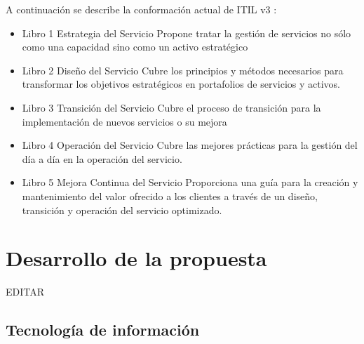 \documentclass[preprint,12pt]{elsarticle}
\begin{document}
A continuación se describe la conformación actual de ITIL v3 :
\begin{itemize}
\item Libro 1  Estrategia del Servicio 
Propone tratar la gestión de servicios no sólo como una capacidad sino como un activo estratégico
\item Libro 2 Diseño del Servicio
Cubre los principios y métodos necesarios para transformar los objetivos estratégicos en portafolios de servicios y activos.
\item Libro 3 Transición del Servicio
Cubre el proceso de transición para la implementación de nuevos servicios o su mejora
\item Libro 4 Operación del Servicio
Cubre las mejores prácticas para la gestión del día a día en la operación del servicio.
\item Libro 5 Mejora Continua del Servicio
Proporciona una guía para la creación y mantenimiento del valor ofrecido a los clientes a través de un diseño, transición y operación del servicio optimizado.
\end{itemize}
\cite{Rios2007}
 



\section{Desarrollo de la propuesta}

EDITAR\\


\subsection{\textbf{Tecnología de información}}
\end{document}
